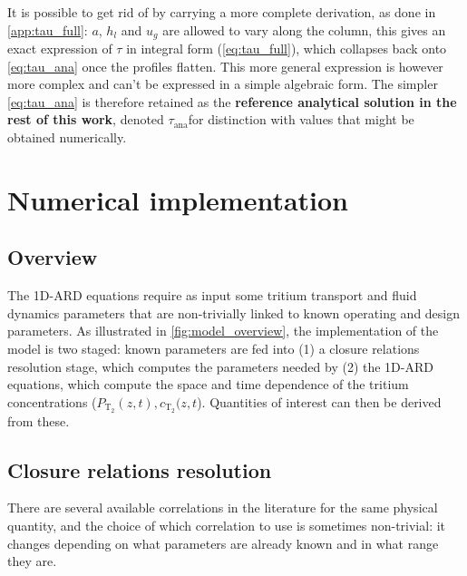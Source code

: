 \documentclass[a4paper,11pt,oneside]{report}
\newcommand{\PT}{\ensuremath{P_\mathrm{T_2}}}
\newcommand{\CT}{\ensuremath{c_\mathrm{T_2}}}
\newcommand{\Tana}{\ensuremath{\tau_\mathrm{ana}}}
\newcounter{assumption}[chapter]
\begin{document}
It is possible to get rid of  by carrying a more complete derivation, as done in \cref{app:tau_full}: $a$, $h_l$ and $u_g$ are allowed to vary along the column, this gives an exact expression of $\tau$ in integral form (\cref{eq:tau_full}), which collapses back onto \cref{eq:tau_ana} once the profiles flatten. This more general expression is however more complex and can't be expressed in a simple algebraic form. The simpler \cref{eq:tau_ana} is therefore retained as the \textbf{reference analytical solution in the rest of this work}, denoted \Tana for distinction with values that might be obtained numerically.



\section{Numerical implementation}
\label{sec:sparging_impl}


\subsection{Overview}
The 1D-ARD equations require as input some tritium transport and fluid dynamics parameters that are non-trivially linked to known operating and design parameters. As illustrated in \cref{fig:model_overview}, the implementation of the model is two staged: known parameters are fed into (1) a closure relations resolution stage, which computes the parameters needed by (2) the 1D-ARD equations, which compute the space and time dependence of the tritium concentrations ($\PT(z,t),\CT(z,t$). Quantities of interest can then be derived from these.



\subsection{Closure relations resolution}
There are several available correlations in the literature for the same physical quantity, and the choice of which correlation to use is sometimes non-trivial: it changes depending on what parameters are already known and in what range they are. 
\end{document}
